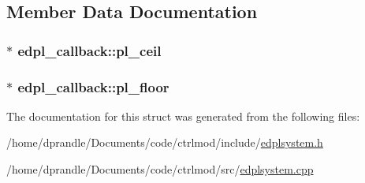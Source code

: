 \subsection{Member Data Documentation}
\hypertarget{structedpl__callback_acab7f06faf5fb508993d61e47f07da75}{
\subsubsection[{pl\-\_\-ceil}]{$\ast$ edpl\-\_\-callback\-::pl\-\_\-ceil}}\label{structedpl__callback_acab7f06faf5fb508993d61e47f07da75}
\hypertarget{structedpl__callback_a6f63343abef0d00077beadfb3a05aab6}{
\subsubsection[{pl\-\_\-floor}]{$\ast$ edpl\-\_\-callback\-::pl\-\_\-floor}}\label{structedpl__callback_a6f63343abef0d00077beadfb3a05aab6}


The documentation for this struct was generated from the following files\-:\begin{DoxyCompactItemize}
\item 
/home/dprandle/\-Documents/code/ctrlmod/include/\hyperlink{edplsystem_8h}{edplsystem.\-h}\item 
/home/dprandle/\-Documents/code/ctrlmod/src/\hyperlink{edplsystem_8cpp}{edplsystem.\-cpp}\end{DoxyCompactItemize}
